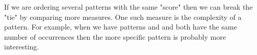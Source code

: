 If we are ordering several patterns with the same "score" then we can break the "tie" by comparing more measures. One such measure is the complexity of a pattern. For example, when we have patterns  and  and both have the same number of occurrences then the more specific pattern is probably more interesting.
